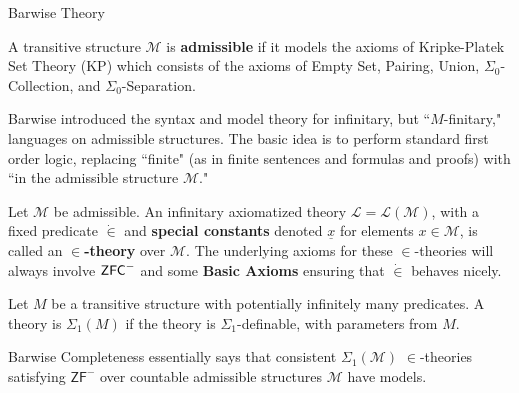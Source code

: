 \documentclass[utf8x,xcolor=svgnames,8pt]{beamer}
\newcommand{\M}{\mathcal{M}}
\newcommand{\ZFC}{\textup{\ensuremath{\textsf{ZFC}}}}
\begin{document}
\begin{frame}{Barwise Theory}
\begin{definition} A transitive structure $\M$ is \textbf{admissible} if it models the axioms of \textsf{Kripke-Platek Set Theory} (\textsf{KP}) which consists of the axioms of \textsf{Empty Set}, \textsf{Pairing}, \textsf{Union}, $\Sigma_0$-\textsf{Collection}, and $\Sigma_0$-\textsf{Separation}. \end{definition}

Barwise introduced the syntax and model theory for infinitary, but ``$M$-finitary," languages on admissible structures. The basic idea is to perform standard first order logic, replacing ``finite" (as in finite sentences and formulas and proofs) with ``in the admissible structure $\mathcal M$."

%
\begin{definition}[$\in$-theory] Let $\M$ be admissible. An infinitary axiomatized theory $\mathcal L=\mathcal L(\M)$, with a fixed predicate $\dot \in$ and \textbf{special constants} denoted $\underline x$ for elements $x \in \M$, is called an \textbf{$\in$-theory} over $\M$. The underlying axioms for these $\in$-theories will always involve $\ZFC^-$ and some \textbf{Basic Axioms} ensuring that $\dot \in$ behaves nicely. \end{definition}

\begin{definition} Let $M$ be a transitive structure with potentially infinitely many predicates. A theory is $\Sigma_1(M)$ if the theory is $\Sigma_1$-definable, with parameters from $M$. \end{definition}

Barwise Completeness essentially says that consistent $\Sigma_1(\M)$ $\in$-theories satisfying $\textsf{ZF}^-$ over countable admissible structures $\M$ have models.
\end{frame}
\end{document}
